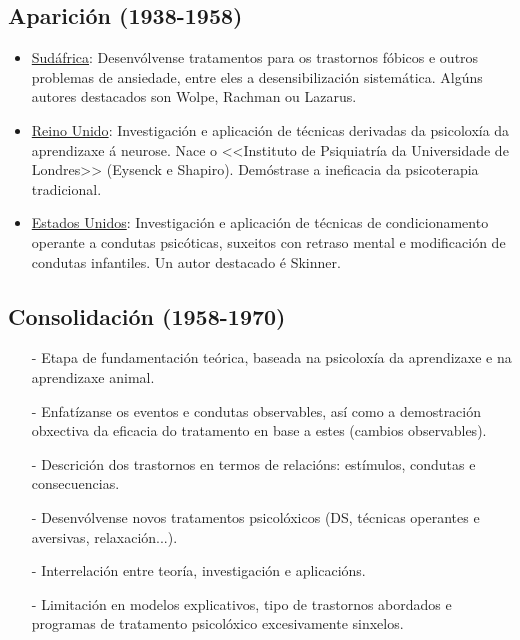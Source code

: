 \documentclass[a4paper,11pt]{article}
\begin{document}
\subsection{Aparición (1938-1958)}
\begin{itemize}
	\item \underline{Sudáfrica}: Desenvólvense tratamentos para os trastornos fóbicos e outros 
	problemas de ansiedade, entre eles a desensibilización sistemática. Algúns autores destacados son 
	Wolpe, Rachman ou Lazarus. 
	\item \underline{Reino Unido}: Investigación e aplicación de técnicas derivadas da psicoloxía da 
	aprendizaxe á neurose. Nace o <<Instituto de Psiquiatría da Universidade de Londres>> (Eysenck e 
	Shapiro). Demóstrase a ineficacia da psicoterapia tradicional. 
	\item \underline{Estados Unidos}: Investigación e aplicación de técnicas de condicionamento 
	operante a condutas psicóticas, suxeitos con retraso mental e modificación de condutas 
	infantiles. Un autor destacado é Skinner.
\end{itemize}

\subsection{Consolidación (1958-1970)}
\begin{itemize}
	\item[-] Etapa de fundamentación teórica, baseada na psicoloxía da aprendizaxe e na aprendizaxe 
	animal.
	\item[-] Enfatízanse os eventos e condutas observables, así como a demostración obxectiva da 
	eficacia do tratamento en base a estes (cambios observables).
	\item[-] Descrición dos trastornos en termos de relacións: estímulos, condutas e consecuencias.
	\item[-] Desenvólvense novos tratamentos psicolóxicos (DS, técnicas operantes e aversivas, 
	relaxación...).
	\item[-] Interrelación entre teoría, investigación e aplicacións.
	\item[-] Limitación en modelos explicativos, tipo de trastornos abordados e programas de 
	tratamento psicolóxico excesivamente sinxelos. 
\end{itemize}
\end{document}
